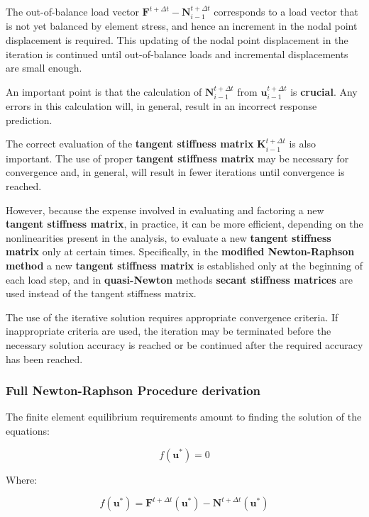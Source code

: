 \documentclass[10pt,b5paper,titlepage]{book}
\begin{document}
The out-of-balance load vector $ \mathbf{F}^{t + \Delta t} - \mathbf{N}_{i-1}^{t + \Delta t} $
corresponds to a load vector that is not yet balanced by element stress, and
hence an increment in the nodal point displacement is required. This updating of the
nodal point displacement in the iteration is continued until out-of-balance loads
and incremental displacements are small enough.

An important point is that the calculation of $ \mathbf{N}_{i-1}^{t + \Delta t} $
from $ \mathbf{u}_{i-1}^{t + \Delta t} $ is \textbf{crucial}. Any errors in this
calculation will, in general, result in an incorrect response prediction.

The correct evaluation of the \textbf{tangent stiffness matrix}
$ \mathbf{K}_{i-1}^{t + \Delta t} $ is also important. The use of proper
\textbf{tangent stiffness matrix} may be necessary for convergence and, in general,
will result in fewer iterations until convergence is reached.

However, because the expense involved in evaluating and factoring a new
\textbf{tangent stiffness matrix}, in practice, it can be more efficient,
depending on the nonlinearities present in the analysis, to evaluate a new
\textbf{tangent stiffness matrix} only at certain times. Specifically,
in the \textbf{modified Newton-Raphson method} a new \textbf{tangent stiffness matrix}
is established only at the beginning of each load step, and in
\textbf{quasi-Newton} methods \textbf{secant stiffness matrices} are used
instead of the tangent stiffness matrix.

The use of the iterative solution requires appropriate convergence criteria.
If inappropriate criteria are used, the iteration may be terminated before
the necessary solution accuracy is reached or be continued after the required
accuracy has been reached.

\subsubsection{Full Newton-Raphson Procedure derivation}

The finite element equilibrium requirements amount to finding the solution
of the equations:

\begin{equation}\label{nr-error}
    f( \mathbf{u}^* ) = 0
\end{equation}

Where:

\begin{equation}\label{nr-error-expanded}
    f( \mathbf{u}^* ) = \mathbf{F}^{t + \Delta t} ( \mathbf{u}^* )
    - \mathbf{N}^{t + \Delta t} ( \mathbf{u}^* )
\end{equation}
\end{document}
